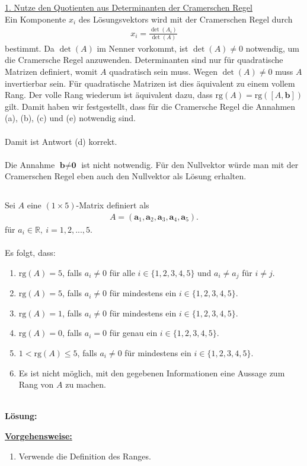 \underline{1. Nutze den Quotienten aus Determinanten der Cramerschen Regel}\\
Ein Komponente $ x_i $ des Lösungsvektors wird mit der Cramerschen Regel durch
\begin{align*}
	x_i = \frac{\det(A_i)}{\det(A)}
\end{align*}
bestimmt. Da $ \det(A)  $ im Nenner vorkommt, ist $ \det(A) \neq 0 $ notwendig, um die Cramersche Regel anzuwenden.
Determinanten sind nur für quadratische Matrizen definiert, womit $ A $ quadratisch sein muss.
Wegen $ \det(A) \neq 0 $ muss $ A $ invertierbar sein. Für quadratische Matrizen ist dies äquivalent zu einem vollem Rang. Der volle Rang wiederum ist äquivalent dazu, dass $ \mathrm{rg}(A) = \mathrm{rg}([A,\textbf{b}]) $ gilt.
Damit haben wir festgestellt, dass für die Cramersche Regel die Annahmen (a), (b), (c) und (e) notwendig sind.\\
\\
Damit ist Antwort (d) korrekt.\\
\\
Die Annahme $ \textbf{b} \neq \textbf{0} $ ist nicht notwendig. Für den Nullvektor würde man mit der Cramerschen Regel eben auch den Nullvektor als Lösung erhalten. 
\newpage

\subsection*{}
Sei $ A $ eine $ (1 \times 5) $-Matrix definiert als
\begin{align*}
	A
	=
	\left(
	\textbf{a}_1,
	\textbf{a}_2,
	\textbf{a}_3,
	\textbf{a}_4,
	\textbf{a}_5
	\right).
\end{align*}
für $ a_i \in \mathbb{R}, \ i = 1,2,...,5 $.\\
\\
Es folgt, dass:
\renewcommand{\labelenumi}{(\alph{enumi})}
\begin{enumerate}
	\item 
	$ \mathrm{rg}(A) = 5 $, falls $ a_i \neq 0 $ für alle $ i \in \{1,2,3,4,5\} $ und $ a_i \neq a_j $ für $ i \neq j $.
	\item
	$ \mathrm{rg}(A) = 5 $, falls $ a_i \neq 0 $ für mindestens ein $ i \in \{1,2,3,4,5\} $.
	\item
	$ \mathrm{rg}(A) = 1 $, falls $ a_i \neq 0 $ für mindestens ein $ i \in \{1,2,3,4,5\} $.
	\item
	$ \mathrm{rg}(A) = 0 $, falls $ a_i = 0 $ für genau ein $ i \in \{1,2,3,4,5\} $.
	\item
	$1 <  \mathrm{rg}(A)\leq 5 $, falls $ a_i \neq 0 $ für mindestens ein $ i \in \{1,2,3,4,5\} $.
	\item 
	Es ist nicht möglich, mit den gegebenen Informationen eine Aussage zum Rang von $ A $ zu machen.
\end{enumerate}
\ \\
\textbf{Lösung:}
\begin{mdframed}
\underline{\textbf{Vorgehensweise:}}
\renewcommand{\labelenumi}{\theenumi.}
\begin{enumerate}
\item Verwende die Definition des Ranges.
\end{enumerate}
\end{mdframed}

